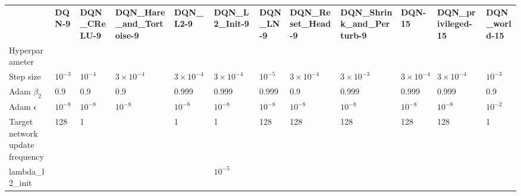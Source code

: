 \begin{tabular}{llllllllllll}
 & \bfseries DQN-9 & \bfseries DQN_CReLU-9 & \bfseries DQN_Hare_and_Tortoise-9 & \bfseries DQN_L2-9 & \bfseries DQN_L2_Init-9 & \bfseries DQN_LN-9 & \bfseries DQN_Reset_Head-9 & \bfseries DQN_Shrink_and_Perturb-9 & \bfseries DQN-15 & \bfseries DQN_privileged-15 & \bfseries DQN_world-15 \\
Hyperparameter &  &  &  &  &  &  &  &  &  &  &  \\
Step size & $10^{-3}$ & $10^{-4}$ & $3 \times 10^{-4}$ & $3 \times 10^{-4}$ & $3 \times 10^{-4}$ & $10^{-5}$ & $3 \times 10^{-4}$ & $3 \times 10^{-3}$ & $3 \times 10^{-4}$ & $3 \times 10^{-4}$ & $10^{-3}$ \\
Adam $\beta_2$ & 0.9 & 0.9 & 0.9 & 0.999 & 0.999 & 0.999 & 0.9 & 0.999 & 0.999 & 0.999 & 0.9 \\
Adam $\epsilon$ & $10^{-8}$ & $10^{-8}$ & $10^{-8}$ & $10^{-8}$ & $10^{-8}$ & $10^{-8}$ & $10^{-8}$ & $10^{-8}$ & $10^{-8}$ & $10^{-8}$ & $10^{-2}$ \\
Target network update frequency & 128 & 1 &  & 1 & 1 & 128 & 128 & 128 & 128 & 128 & 1 \\
lambda_l2_init &  &  &  &  & $10^{-5}$ &  &  &  &  &  &  \\
\end{tabular}
